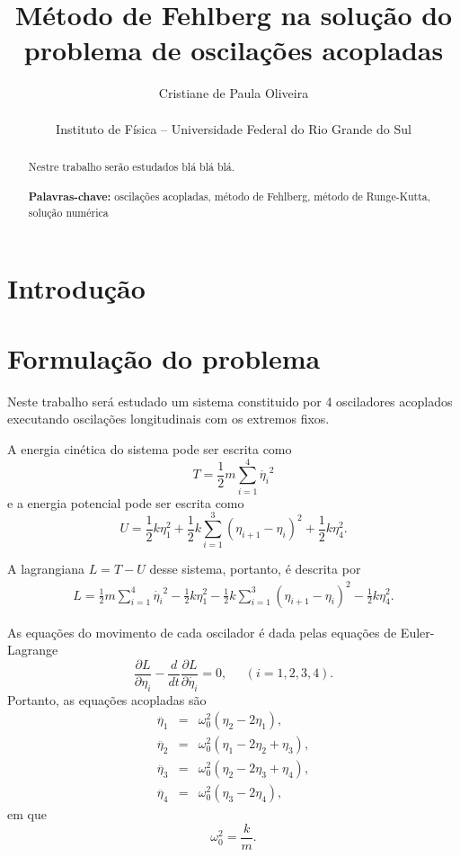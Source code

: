\documentclass[brazilian, 12pt, a4paper, final]{article}
\title{\textbf{Método de Fehlberg na solução do problema de oscilações acopladas}}
\author{Cristiane de Paula Oliveira\\\\\small{Instituto de Física -- Universidade Federal do Rio Grande do Sul}}
\begin{document}
\maketitle

\begin{abstract}
  \noindent
  Nestre trabalho serão estudados blá blá blá. \\
  \\
  \textbf{Palavras-chave:} oscilações acopladas, método de Fehlberg, método de Runge-Kutta, solução numérica
\end{abstract}
\begin{multicols*}{2}
\section{Introdução}


\section{Formulação do problema}
Neste trabalho será estudado um sistema constituido por 4 osciladores acoplados executando oscilações longitudinais com os extremos fixos.

A energia cinética do sistema pode ser escrita como
\begin{equation}
	T=\frac{1}{2}m\sum_{i=1}^{4}\dot{\eta_i}^2
\end{equation}
e a energia potencial pode ser escrita como
\begin{equation}
	U=\frac{1}{2}k\eta_1^2+\frac{1}{2}k\sum_{i=1}^{3}(\eta_{i+1}-\eta_{i})^2 + \frac{1}{2}k\eta_4^2.
\end{equation}
 
 A lagrangiana $L=T-U$ desse sistema, portanto, é descrita por
 \begin{eqnarray}
 	 L=\frac{1}{2}m\sum_{i=1}^{4}\dot{\eta_i}^2-\frac{1}{2}k\eta_1^2-\frac{1}{2}k\sum_{i=1}^{3}(\eta_{i+1}-\eta_{i})^2 - \frac{1}{2}k\eta_4^2.
 \end{eqnarray}
 
 As equações do movimento de cada oscilador é dada pelas equações de Euler-Lagrange
 \begin{equation}
 	\frac{\partial L }{\partial\eta_i}-\frac{d}{dt}\frac{\partial L}{\partial \dot{\eta_i}}=0,\;\;\;\;\; (i=1,2,3,4).
 \end{equation}
Portanto, as equações acopladas são
\begin{eqnarray}
	\ddot{\eta_1}&=&\omega_0^2(\eta_2-2\eta_1), \\
	\ddot{\eta_2}&=&\omega_0^2(\eta_1-2\eta_2+\eta_3), \\
	\ddot{\eta_3}&=&\omega_0^2(\eta_2-2\eta_3+\eta_4), \\
	\ddot{\eta_4}&=&\omega_0^2(\eta_3-2\eta_4),
\end{eqnarray}
em que
\begin{equation}
	\omega_0^2=\frac{k}{m}.
\end{equation}


\end{multicols*}
\end{document}
